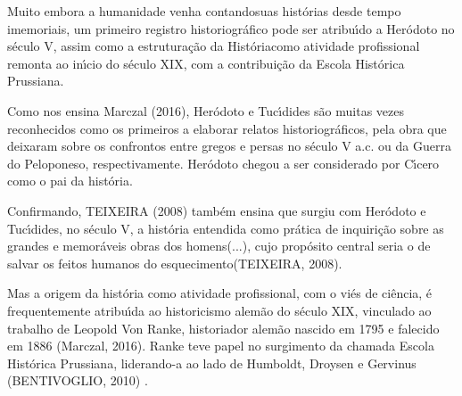 \documentclass[
12pt,		%
openright,	%
twoside,  %
a4paper,			%
chapter=TITLE,		%
english,			%
french,				%
spanish,			%
brazil				%
]{USPSC-classe/USPSC}
\begin{document}
Muito embora a humanidade venha \textquotedbl contando\textquotedbl  suas hist\'orias desde tempo imemoriais, um primeiro registro historiogr\'afico pode ser atribu\'{\i}do a Her\'odoto no s\'eculo V, assim como a estrutura\c{c}\~ao da \textquotedbl Hist\'oria\textquotedbl  como atividade profissional remonta ao in\'{\i}cio do s\'eculo XIX, com a contribui\c{c}\~ao da Escola Hist\'orica Prussiana.









Como nos ensina  Marczal (2016),  Her\'odoto e Tuc\'{\i}dides s\~ao muitas vezes reconhecidos como os primeiros a elaborar relatos historiogr\'aficos, pela obra que deixaram sobre os confrontos entre gregos e persas no s\'eculo V a.c. ou da Guerra do Peloponeso, respectivamente. Her\'odoto chegou a ser considerado por C\'{\i}cero como o \textquotedbl pai da hist\'oria\textquotedbl .









Confirmando, TEIXEIRA (2008)  tamb\'em ensina que surgiu com Her\'odoto e Tuc\'{\i}dides, no s\'eculo V, a hist\'oria \textquotedbl entendida como pr\'atica de inquiri\c{c}\~ao sobre as grandes e memor\'aveis obras dos homens(...), cujo prop\'osito central seria o de salvar os feitos humanos do esquecimento\textquotedbl   (TEIXEIRA, 2008).









Mas a origem da hist\'oria como atividade profissional, com o vi\'es de ci\^encia, \'e frequentemente atribu\'{\i}da ao historicismo alem\~ao do s\'eculo XIX, vinculado ao trabalho de Leopold Von Ranke, historiador alem\~ao nascido em 1795 e falecido em 1886 (Marczal, 2016). Ranke teve papel no surgimento da chamada Escola Hist\'orica Prussiana, liderando-a ao lado de Humboldt, Droysen e Gervinus  (BENTIVOGLIO, 2010) .
\end{document}
